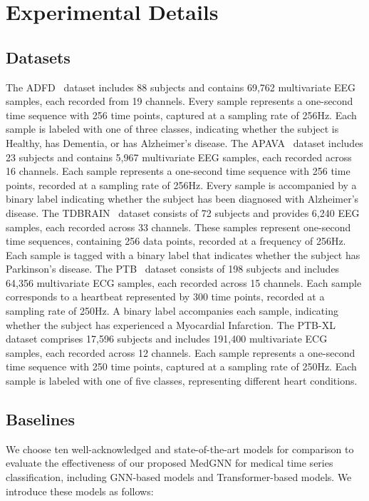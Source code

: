 \appendix
\section{Experimental Details}

\subsection{Datasets}\label{appendix_dataset}
The ADFD~\cite{miltiadous2023dataset} dataset includes 88 subjects and contains 69,762 multivariate EEG samples, each recorded from 19 channels. Every sample represents a one-second time sequence with 256 time points, captured at a sampling rate of 256Hz. Each sample is labeled with one of three classes, indicating whether the subject is Healthy, has Dementia, or has Alzheimer's disease.
The APAVA~\cite{escudero2006analysis} dataset includes 23 subjects and contains 5,967 multivariate EEG samples, each recorded across 16 channels. Each sample represents a one-second time sequence with 256 time points, recorded at a sampling rate of 256Hz. Every sample is accompanied by a binary label indicating whether the subject has been diagnosed with Alzheimer’s disease. 
The TDBRAIN~\cite{van2022two} dataset consists of 72 subjects and provides 6,240 EEG samples, each recorded across 33 channels. These samples represent one-second time sequences, containing 256 data points, recorded at a frequency of 256Hz. Each sample is tagged with a binary label that indicates whether the subject has Parkinson's disease. 
The PTB~\cite{physiobank2000physionet} dataset consists of 198 subjects and includes 64,356 multivariate ECG samples, each recorded across 15 channels. Each sample corresponds to a heartbeat represented by 300 time points, recorded at a sampling rate of 250Hz. A binary label accompanies each sample, indicating whether the subject has experienced a Myocardial Infarction.
The PTB-XL~\cite{wagner2020ptb} dataset comprises 17,596 subjects and includes 191,400 multivariate ECG samples, each recorded across 12 channels. Each sample represents a one-second time sequence with 250 time points, captured at a sampling rate of 250Hz. Each sample is labeled with one of five classes, representing different heart conditions.

\subsection{Baselines}\label{appendix_baseline}
We choose ten well-acknowledged and state-of-the-art models for comparison to evaluate the effectiveness of our proposed MedGNN for medical time series classification, including GNN-based models and Transformer-based models. We introduce these models as follows:


